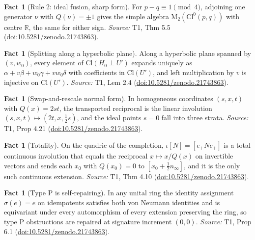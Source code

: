 \documentclass[11pt]{article}
\theoremstyle{definition}
\newtheorem{fact}[theorem]{Fact}
\theoremstyle{plain}
\providecommand{\Cl}{}\renewcommand{\Cl}{\mathrm{Cl}}
\providecommand{\Mat}{}\renewcommand{\Mat}{\mathrm{M}}
\providecommand{\R}{}\renewcommand{\R}{\mathbb{R}}
\providecommand{\nInf}{}\renewcommand{\nInf}{n_\infty}
\begin{document}
\begin{fact}[Rule 2: ideal fusion, sharp form]\label{c:transport.rule-2-ideal-fusion-sharp-form}
For $p - q \equiv 1 \pmod 4$, adjoining one generator $\nu$ with $Q(\nu) = \pm 1$ gives the simple algebra $\Mat_2(\Cl^0(p,q))$ with centre $\R$, the same for either sign.
\emph{Source:} T1, Thm 5.5 (\href{https://doi.org/10.5281/zenodo.21743863}{doi:10.5281/zenodo.21743863}).
\end{fact}

\begin{fact}[Splitting along a hyperbolic plane]\label{c:transport.splitting-along-hyperbolic-plane}
Along a hyperbolic plane spanned by $(v, w_0)$, every element of $\Cl(H_0 \perp U')$ expands uniquely as $\alpha + v\beta + w_0\gamma + v w_0\delta$ with coefficients in $\Cl(U')$, and left multiplication by $v$ is injective on $\Cl(U')$.
\emph{Source:} T1, Lem 2.4 (\href{https://doi.org/10.5281/zenodo.21743863}{doi:10.5281/zenodo.21743863}).
\end{fact}

\begin{fact}[Swap-and-rescale normal form]\label{c:transport.swap-rescale-normal-form}
In homogeneous coordinates $(s, x, t)$ with $Q(x) = 2st$, the transported reciprocal is the linear involution $(s, x, t) \mapsto (2t, x, \frac12 s)$, and the ideal points $s = 0$ fall into three strata.
\emph{Source:} T1, Prop 4.21 (\href{https://doi.org/10.5281/zenodo.21743863}{doi:10.5281/zenodo.21743863}).
\end{fact}

\begin{fact}[Totality]\label{c:transport.totality}
On the quadric of the completion, $\iota[N] = [e_+ N e_+]$ is a total continuous involution that equals the reciprocal $x \mapsto x/Q(x)$ on invertible vectors and sends each $x_0$ with $Q(x_0) = 0$ to $[x_0 + \frac12 \nInf]$, and it is the only such continuous extension.
\emph{Source:} T1, Thm 4.10 (\href{https://doi.org/10.5281/zenodo.21743863}{doi:10.5281/zenodo.21743863}).
\end{fact}

\begin{fact}[Type P is self-repairing]\label{c:transport.type-p-self-repairing}
In any unital ring the identity assignment $\sigma(e) = e$ on idempotents satisfies both von Neumann identities and is equivariant under every automorphism of every extension preserving the ring, so type P obstructions are repaired at signature increment $(0,0)$.
\emph{Source:} T1, Prop 6.1 (\href{https://doi.org/10.5281/zenodo.21743863}{doi:10.5281/zenodo.21743863}).
\end{fact}
\end{document}
